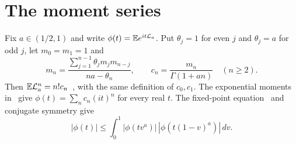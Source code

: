 \section{The moment series}\label{or:moment-series}
Fix $a\in(1/2,1)$ and write $\phi(t)=\mathbb{E} e^{it\mathcal L_a}$.
Put $\theta_j=1$ for even $j$ and $\theta_j=a$ for odd $j$, let
$m_0=m_1=1$ and
\[
 m_n=\frac{\sum_{j=1}^{n-1}\theta_jm_jm_{n-j}}{na-\theta_n},
 \qquad c_n=\frac{m_n}{\Gamma(1+an)}\quad(n\ge2).
\]
Then $\mathbb{E}\mathcal L_a^n=n!c_n$~\cite[Theorem~1.4]{glr2026},
with the same definition of $c_0,c_1$.
The exponential moments in~\cite[Corollary~2.11]{glr2026} give
$\phi(t)=\sum_nc_n(it)^n$ for every real $t$.
The fixed-point equation~\cite[Theorem~1.1 and (2.10)]{glr2026}
and conjugate symmetry give
\begin{equation}\label{eq:thr-fixed}
 |\phi(t)|\le\int_0^1|\phi(tv^a)|\,
                 |\phi(t(1-v)^a)|\,dv.
\end{equation}
